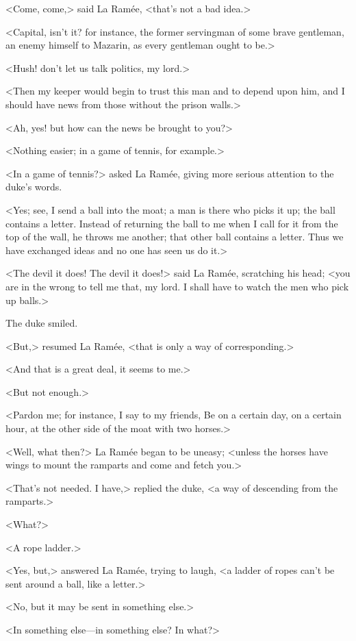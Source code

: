 <Come, come,> said La Ramée, <that's not a bad idea.>

<Capital, isn't it? for instance, the former servingman of some brave gentleman, an enemy himself to Mazarin, as every gentleman ought to be.>

<Hush! don't let us talk politics, my lord.>

<Then my keeper would begin to trust this man and to depend upon him, and I should have news from those without the prison walls.>

<Ah, yes! but how can the news be brought to you?>

<Nothing easier; in a game of tennis, for example.>

<In a game of tennis?> asked La Ramée, giving more serious attention to the duke's words.

<Yes; see, I send a ball into the moat; a man is there who picks it up; the ball contains a letter. Instead of returning the ball to me when I call for it from the top of the wall, he throws me another; that other ball contains a letter. Thus we have exchanged ideas and no one has seen us do it.>

<The devil it does! The devil it does!> said La Ramée, scratching his head; <you are in the wrong to tell me that, my lord. I shall have to watch the men who pick up balls.>

The duke smiled.

<But,> resumed La Ramée, <that is only a way of corresponding.>

<And that is a great deal, it seems to me.>

<But not enough.>

<Pardon me; for instance, I say to my friends, Be on a certain day, on a certain hour, at the other side of the moat with two horses.>

<Well, what then?> La Ramée began to be uneasy; <unless the horses have wings to mount the ramparts and come and fetch you.>

<That's not needed. I have,> replied the duke, <a way of descending from the ramparts.>

<What?>

<A rope ladder.>

<Yes, but,> answered La Ramée, trying to laugh, <a ladder of ropes can't be sent around a ball, like a letter.>

<No, but it may be sent in something else.>

<In something else—in something else? In what?>


